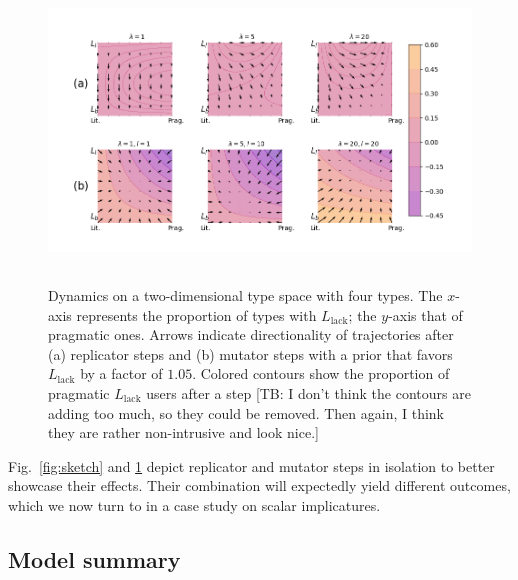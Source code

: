 \documentclass[a4paper, 11pt]{article}
\theoremstyle{Satz}
\newcommand{\tb}[1]{\textcolor[rgb]{.8,.33,.0}{[TB: #1]}}%
\newcommand{\mylang}[1]{\ensuremath{L_{\text{#1}}}\xspace} %
\newcommand{\Llack}{\mylang{lack}}
\begin{document}
\begin{figure}[t]
\centering
\includegraphics[width=\textwidth,height=8cm, keepaspectratio]{./plots/fig-contourb105k5.png}
\caption{Dynamics on a two-dimensional type space with four types. The $x$-axis represents the proportion of types with $\Llack$; the $y$-axis that of pragmatic ones. Arrows indicate directionality of trajectories after (a) replicator steps and (b) mutator steps with a prior that favors $\Llack$ by a factor of $1.05$. Colored contours show the proportion of pragmatic $\Llack$ users after a step \tb{I don't think the contours are adding too much, so they could be removed. Then again, I think they are rather non-intrusive and look nice.}}

\label{fig:quiver}
\end{figure}

Fig.~\ref{fig:sketch} and \ref{fig:quiver} depict replicator and mutator steps in isolation to better showcase their effects. Their combination will expectedly yield different outcomes, which we now turn to in a case study on scalar implicatures. 

\subsection{Model summary}
\end{document}
